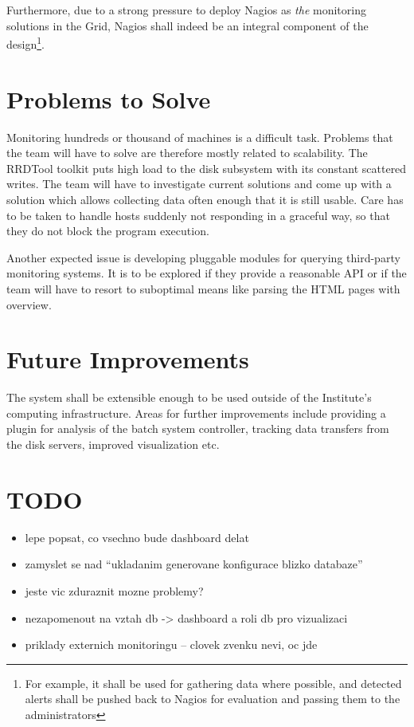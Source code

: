 \documentclass[12pt]{article}
\begin{document}
Furthermore, due to a strong pressure to deploy Nagios as {\em the} monitoring solutions in the Grid, Nagios shall indeed be an
integral component of the design\footnote{For example, it shall be used for gathering data where possible, and detected alerts
shall be pushed back to Nagios for evaluation and passing them to the administrators}.

\section{Problems to Solve}

Monitoring hundreds or thousand of machines is a difficult task.  Problems that the team will have to solve are therefore mostly
related to scalability.  The RRDTool toolkit puts high load to the disk subsystem with its constant scattered writes.  The team
will have to investigate current solutions and come up with a solution which allows collecting data often enough that it is still
usable.  Care has to be taken to handle hosts suddenly not responding in a graceful way, so that they do not block the program
execution.

Another expected issue is developing pluggable modules for querying third-party monitoring systems.  It is to be explored if they
provide a reasonable API or if the team will have to resort to suboptimal means like parsing the HTML pages with overview.

\section{Future Improvements}

The system shall be extensible enough to be used outside of the Institute's computing infrastructure.  Areas for further
improvements include providing a plugin for analysis of the batch system controller, tracking data transfers from the disk
servers, improved visualization etc.

\section{TODO}

\begin{itemize}
    \item{lepe popsat, co vsechno bude dashboard delat}
    \item{zamyslet se nad ``ukladanim generovane konfigurace blizko databaze''}
    \item{jeste vic zduraznit mozne problemy?}
    \item{nezapomenout na vztah db -> dashboard a roli db pro vizualizaci}
    \item{priklady externich monitoringu -- clovek zvenku nevi, oc jde}
\end{itemize}
\end{document}
